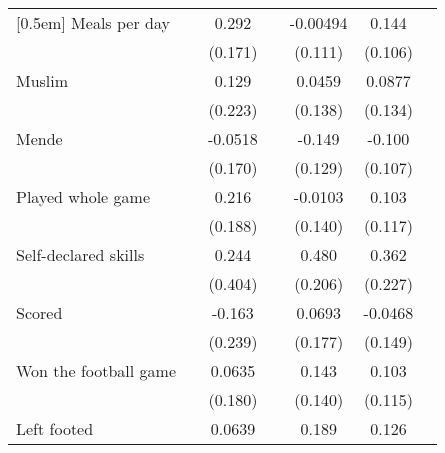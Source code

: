 {\begin{tabularx}{0.8\textwidth}{Xl*{5}{c}}
[0.5em]
Meals per day       &                     &       0.292\sym{*}  &                     &    -0.00494         &       0.144         \\
                    &                     &     (0.171)         &                     &     (0.111)         &     (0.106)         \\
[0.5em]
Muslim              &                     &       0.129         &                     &      0.0459         &      0.0877         \\
                    &                     &     (0.223)         &                     &     (0.138)         &     (0.134)         \\
[0.5em]
Mende               &                     &     -0.0518         &                     &      -0.149         &      -0.100         \\
                    &                     &     (0.170)         &                     &     (0.129)         &     (0.107)         \\
[0.5em]
Played whole game   &                     &       0.216         &                     &     -0.0103         &       0.103         \\
                    &                     &     (0.188)         &                     &     (0.140)         &     (0.117)         \\
[0.5em]
Self-declared skills&                     &       0.244         &                     &       0.480\sym{**} &       0.362         \\
                    &                     &     (0.404)         &                     &     (0.206)         &     (0.227)         \\
[0.5em]
Scored              &                     &      -0.163         &                     &      0.0693         &     -0.0468         \\
                    &                     &     (0.239)         &                     &     (0.177)         &     (0.149)         \\
[0.5em]
Won the football game&                     &      0.0635         &                     &       0.143         &       0.103         \\
                    &                     &     (0.180)         &                     &     (0.140)         &     (0.115)         \\
[0.5em]
Left footed         &                     &      0.0639         &                     &       0.189         &       0.126         \\

\end{tabularx}}
